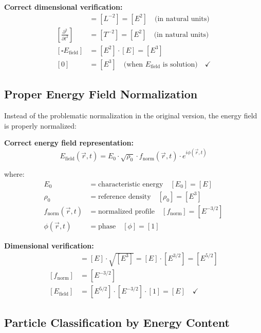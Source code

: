 \documentclass[12pt,a4paper]{report}
\begin{document}
\textbf{Correct dimensional verification:}
\begin{align}
	[\nabla^2] &= [L^{-2}] = [E^2] \quad \text{(in natural units)} \\
	\left[\frac{\partial^2}{\partial t^2}\right] &= [T^{-2}] = [E^2] \quad \text{(in natural units)} \\
	[\square E_{\text{field}}] &= [E^2] \cdot [E] = [E^3] \\
	[0] &= [E^3] \quad \text{(when } E_{\text{field}} \text{ is solution)} \quad \checkmark
\end{align}

\subsection{Proper Energy Field Normalization}
\label{subsec:proper_normalization}

Instead of the problematic normalization in the original version, the energy field is properly normalized:

\textbf{Correct energy field representation:}
\begin{equation}
	E_{\text{field}}(\vec{r}, t) = E_0 \cdot \sqrt{\rho_0} \cdot f_{\text{norm}}(\vec{r}, t) \cdot e^{i\phi(\vec{r}, t)}
\end{equation}

where:
\begin{align}
	E_0 &= \text{characteristic energy} \quad [E_0] = [E] \\
	\rho_0 &= \text{reference density} \quad [\rho_0] = [E^3] \\
	f_{\text{norm}}(\vec{r}, t) &= \text{normalized profile} \quad [f_{\text{norm}}] = [E^{-3/2}] \\
	\phi(\vec{r}, t) &= \text{phase} \quad [\phi] = [1]
\end{align}

\textbf{Dimensional verification:}
\begin{align}
	[E_0 \cdot \sqrt{\rho_0}] &= [E] \cdot \sqrt{[E^3]} = [E] \cdot [E^{3/2}] = [E^{5/2}] \\
	[f_{\text{norm}}] &= [E^{-3/2}] \\
	[E_{\text{field}}] &= [E^{5/2}] \cdot [E^{-3/2}] \cdot [1] = [E] \quad \checkmark
\end{align}

\subsection{Particle Classification by Energy Content}
\label{subsec:particle_classification}
\end{document}
